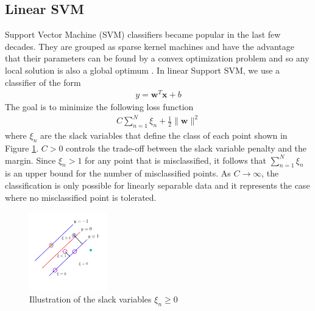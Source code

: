 \documentclass[letterpaper, 10 pt, conference]{ieeeconf}  %
\begin{document}
\subsection{Linear SVM}
Support Vector Machine (SVM) classifiers became popular in the last few decades. They are grouped as sparse kernel machines and have the advantage that their parameters can be found by a convex optimization problem and so any local solution is also a global optimum \cite{bishop:2006:PRML}. In linear Support SVM, we use a classifier of the form
\begin{align}
y= \mathbf{w}^T\mathbf{x}+b
\end{align}
The goal is to minimize the following loss function
\begin{align}
C\sum_{n=1}^N\xi_n+\frac 12\|\mathbf{w}\|^2
\end{align}
where $\xi_n$ are the slack variables that define the class of each point shown in Figure \ref{fig:svmSlack}. $C>0$ controls the trade-off between the slack variable penalty and the margin. Since $\xi_n>1$ for any point that is misclassified, it follows that $\sum_{n=1}^N\xi_n$ is an upper bound for the number of misclassified points. As $C\to\infty$, the classification is only possible for linearly separable data and it represents the case where no misclassified point is tolerated.
\begin{figure}[h]
	\begin{center}
		\includegraphics[width=0.3\textwidth]{figures/svmSlack.png}  %
		\caption{Illustration of the slack variables $\xi_n\ge 0$ \cite[p.~332]{bishop:2006:PRML}}
		\label{fig:svmSlack}
	\end{center}
\end{figure}
\end{document}
